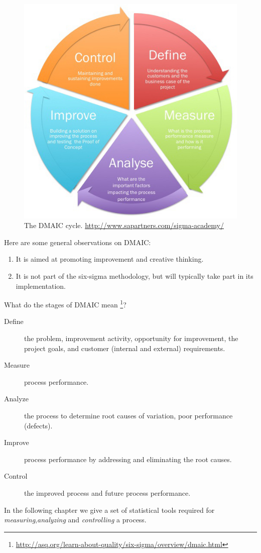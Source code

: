 \documentclass[12pt,a4paper]{report}
\theoremstyle{plain}
\theoremstyle{definition}
\begin{document}
\begin{figure}[t]
\centering
\includegraphics[width=0.6\linewidth]{art/Sigma_detail}
\caption[DMAIC]{The DMAIC cycle. \newline
\url{http://www.sapartners.com/sigma-academy/}}
\label{fig:DMAIC}
\end{figure}

Here are some general observations on DMAIC:
\begin{enumerate}
\item It is aimed at promoting improvement and creative thinking.
\item It is not part of the six-sigma methodology, but will typically take part in its implementation.
\end{enumerate}

What do the stages of DMAIC mean \footnote{\url{http://asq.org/learn-about-quality/six-sigma/overview/dmaic.html}}?
\begin{description}
\item [Define] the problem, improvement activity, opportunity for improvement, the project goals, and customer (internal and external) requirements.
\item [Measure] process performance.
\item [Analyze] the process to determine root causes of variation, poor performance (defects).
\item [Improve] process performance by addressing and eliminating the root causes.
\item [Control] the improved process and future process performance.
\end{description}

In the following chapter we give a set of statistical tools required for \emph{measuring},\emph{analyzing} and \emph{controlling} a process.
\end{document}

